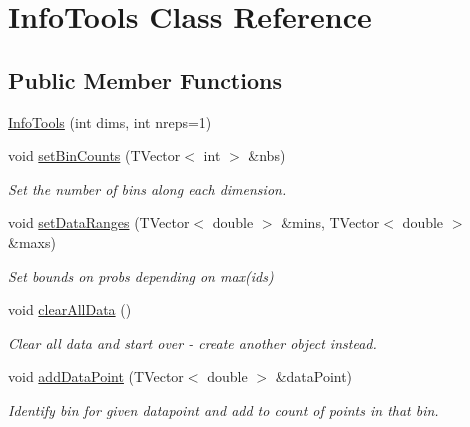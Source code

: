 \hypertarget{class_info_tools}{}\section{Info\+Tools Class Reference}
\label{class_info_tools}
\subsection*{Public Member Functions}
\begin{DoxyCompactItemize}
\item 
\mbox{\hyperlink{class_info_tools_a17566be3831cc61275587e09c775b49d}{Info\+Tools}} (int dims, int nreps=1)
\item 
void \mbox{\hyperlink{class_info_tools_a43f55f31c65c762da3ae1026abd51465}{set\+Bin\+Counts}} (T\+Vector$<$ int $>$ \&nbs)
\begin{DoxyCompactList}\small\item\em Set the number of bins along each dimension. \end{DoxyCompactList}\item 
void \mbox{\hyperlink{class_info_tools_aa16157a741626b58c79383fd131cb060}{set\+Data\+Ranges}} (T\+Vector$<$ double $>$ \&mins, T\+Vector$<$ double $>$ \&maxs)
\begin{DoxyCompactList}\small\item\em Set bounds on probs depending on max(ids) \end{DoxyCompactList}\item 
\mbox{\label{class_info_tools_a28a6530274d327dc7c96def168daf04f}} 
void \mbox{\hyperlink{class_info_tools_a28a6530274d327dc7c96def168daf04f}{clear\+All\+Data}} ()
\begin{DoxyCompactList}\small\item\em Clear all data and start over -\/ create another object instead. \end{DoxyCompactList}\item 
void \mbox{\hyperlink{class_info_tools_ae59fff52cbd2513ccd3d3f8bd5a4243d}{add\+Data\+Point}} (T\+Vector$<$ double $>$ \&data\+Point)
\begin{DoxyCompactList}\small\item\em Identify bin for given datapoint and add to count of points in that bin. \end{DoxyCompactList}\item 
\mbox{\label{class_info_tools_a0ab715f654addd166a31b85f4235e22a}} 

\end{DoxyCompactItemize}
